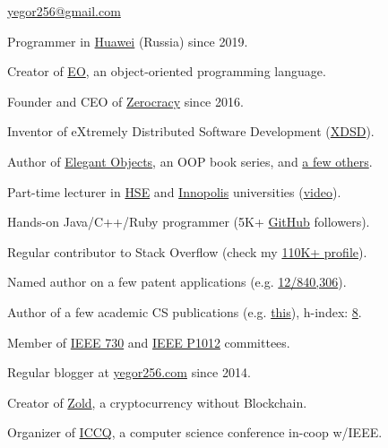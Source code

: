 \documentclass{yb}
\renewcommand\emph[1]{#1}
\begin{document}
\ybPrintPhoto{}

{\scshape\bfseries\Large {}}\newline
\href{mailto:yegor256@gmail.com}{yegor256@gmail.com}

\vspace{1em}

Programmer in \emph{\href{https://www.huawei.com}{Huawei}} (Russia) since 2019.

Creator of \href{https://www.eolang.org}{EO}, an object-oriented \emph{programming language}.

Founder and CEO of \emph{\href{https://www.zerocracy.com}{Zerocracy}} since 2016.

Inventor of eXtremely Distributed Software Development (\href{https://www.xdsd.org}{XDSD}).

Author of \emph{\href{https://www.yegor256.com/elegant-objects.html}{Elegant Objects}},
  an OOP book series, and \href{https://www.yegor256.com/books.html}{a few others}.

Part-time \emph{lecturer} in \href{https://www.hse.ru/en/}{HSE}
  and \href{https://innopolis.university/en/}{Innopolis} universities
  (\href{https://www.youtube.com/playlist?list=PLaIsQH4uc08y14wCJMeffS2yErN4QpB8m}{video}).

Hands-on Java/C++/Ruby programmer
  (5K+ \emph{\href{https://github.com/yegor256}{GitHub}} followers).

Regular contributor to \emph{Stack Overflow}
  (check my \href{https://stackexchange.com/users/63162/yegor256}{110K+ profile}).

Named author on a few patent applications
  (e.g. \href{https://www.google.com/patents/US20120023476}{12/840,306}).

Author of a few academic CS \emph{publications}
  (e.g. \href{https://link.springer.com/chapter/10.1007/978-3-642-02152-7_6}{this}),
  h-index: \href{https://scholar.google.com/citations?user=cYmXh60AAAAJ}{8}.

Member of \href{http://standards.ieee.org/develop/wg/730.html}{IEEE 730} and
  \href{https://standards.ieee.org/ieee/1012/7324/}{IEEE P1012} committees.

Regular \emph{blogger} at \href{https://www.yegor256.com/}{yegor256.com} since 2014.

Creator of \href{https://www.zold.io}{Zold}, a cryptocurrency without Blockchain.

Organizer of \href{https://www.iccq.ru}{\emph{ICCQ}},
  a computer science conference in-coop w/IEEE.
\end{document}
